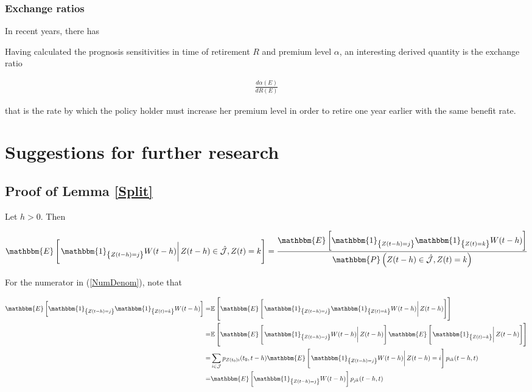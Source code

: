 \documentclass{book}
\newcommand{\1}[1]{\mathbbm{1}_{\left\lbrace #1 \right\rbrace}}
\newcommand{\expec}[1][def]{\mathbbm{E} \left[ #1 \right]}
\newcommand{\econd}[2][def]{\mathbbm{E} \left[ \left. #1 \right| #2 \right]}
\newcommand{\probability}[1][def]{\mathbbm{P} \left( #1 \right)}
\theoremstyle{break}
\theoremstyle{remark}
\numberwithin{equation}{section}
\begin{document}
\subsection{Exchange ratios}

In recent years, there has

Having calculated the prognosis sensitivities in time of retirement $R$ and premium level $\alpha$, an interesting derived quantity is the exchange ratio

\begin{align*}
	\frac{d \alpha (E)}{d R (E)}
\end{align*}

that is the rate by which the policy holder must increase her premium level in order to retire one year earlier with the same benefit rate. 

\chapter{Suggestions for further research}




\newpage

\appendix

\section{Proof of Lemma \ref{Split}}

Let $h>0$. Then

\begin{align} \label{NumDenom}
	\econd[\1{Z(t-h)=j} W(t-h)]{Z(t-h) \in \hat{\mathcal{J}}, Z(t) = k} = \frac{\expec[\1{Z(t-h)=j} \1{Z(t)=k} W(t-h)]}{\probability[Z(t-h) \in \hat{\mathcal{J}}, Z(t)=k]}
\end{align}

For the numerator in (\ref{NumDenom}), note that 

\begin{align*}
	\expec[\1{Z(t-h)=j} \1{Z(t)=k} W(t-h)] =& \mathbb{E} \left[ \econd[\1{Z(t-h)=j} \1{Z(t)=k} W(t-h)]{Z(t-h)} \right] \\
	=& \mathbb{E} \left[ \econd[\1{Z(t-h)=j} W(t-h)]{Z(t-h)} \econd[\1{Z(t)=k}]{Z(t-h)} \right] \\
	=& \sum_{i \in \mathcal{J}} p_{Z(t_0)i}(t_0,t-h) \econd[\1{Z(t-h)=j} W(t-h)]{Z(t-h)=i} p_{ik}(t-h,t) \\
	=& \expec[\1{Z(t-h)=j} W(t-h)] p_{jk}(t-h,t)
\end{align*}
\end{document}
